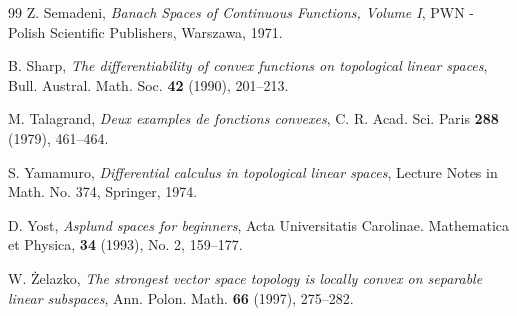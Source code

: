 \documentclass[12pt]{amsart}
\theoremstyle{plain}
\theoremstyle{definition}
\theoremstyle{remark}
\begin{document}
\begin{thebibliography}{99}
 Z. Semadeni,
\newblock \textit{Banach Spaces of Continuous Functions, Volume I},
\newblock PWN - Polish Scientific Publishers, Warszawa, 1971.

 B. Sharp,
\newblock \textit{The differentiability of convex functions on topological linear spaces}, Bull. Austral. Math. Soc.
\textbf{42} (1990), 201--213.

 M. Talagrand,
\newblock \textit{Deux examples de fonctions convexes},
C. R. Acad. Sci. Paris \textbf{288} (1979), 461--464.

 S. Yamamuro,
\newblock \textit{Differential calculus in topological linear spaces},
 Lecture Notes in Math. No. 374, Springer, 1974.

 D. Yost,
\newblock \textit{Asplund spaces for beginners},
Acta Universitatis Carolinae. Mathematica et Physica, \textbf{34} (1993), No. 2, 159--177.

 W. \. {Z}elazko,
\newblock \textit{The strongest vector space topology is locally convex on separable linear subspaces},
 Ann. Polon. Math. \textbf{66} (1997), 275--282.

\end{thebibliography}
\end{document}
